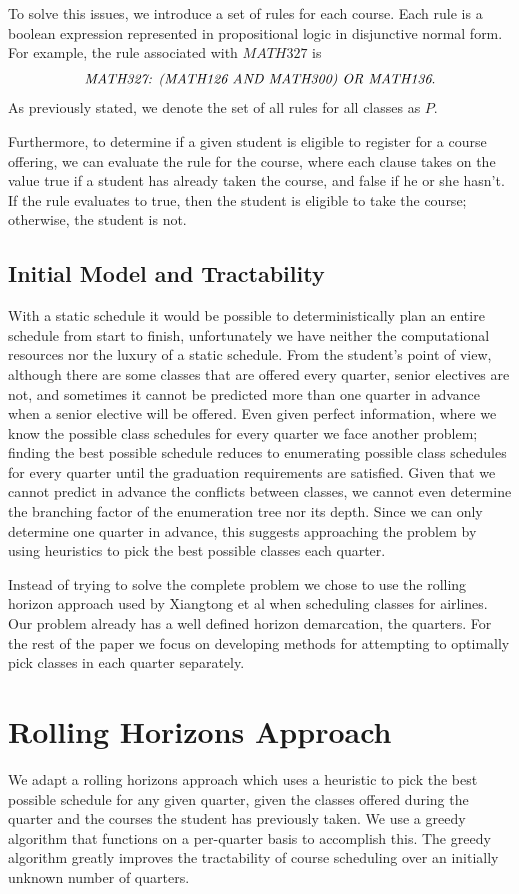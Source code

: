 \documentclass[11pt]{article} %
\begin{document}
To solve this issues, we introduce a set of rules for each course. Each rule is
a boolean expression represented in propositional logic in disjunctive normal
form. For example, the rule associated with $MATH327$ is $$ \text{{\it MATH327:
(MATH126 AND MATH300) OR MATH136}}.  $$ As previously stated, we denote the set
of all rules for all classes as $P$.

Furthermore, to determine if a given student is eligible to register for
a course offering, we can evaluate the rule for the course, where each clause
takes on the value true if a student has already taken the course, and false if
he or she hasn't. If the rule evaluates to true, then the student is eligible to
take the course; otherwise, the student is not.

\subsection{Initial Model and Tractability} With a static schedule it would be
possible to deterministically plan an entire schedule from start to finish,
unfortunately we have neither the computational resources nor the luxury of
a static schedule. From the student’s point of view, although there are some
classes that are offered every quarter, senior electives are not, and sometimes
it cannot be predicted more than one quarter in advance when a senior elective
will be offered. Even given perfect information, where we know the possible
class schedules for every quarter we face another problem; finding the best
possible schedule reduces to enumerating possible class schedules for every
quarter until the graduation requirements are satisfied. Given that we cannot
predict in advance the conflicts between classes, we cannot even determine the
branching factor of the enumeration tree nor its depth. Since we can only
determine one quarter in advance, this suggests approaching the problem by using
heuristics to pick the best possible classes each quarter.

Instead of trying to solve the complete problem we chose to use the rolling
horizon approach used by Xiangtong et al \cite{xiangton:informs} when scheduling
classes for airlines. Our problem already has a well defined horizon
demarcation, the quarters. For the rest of the paper we focus on developing
methods for attempting to optimally pick classes in each quarter separately.

\section{Rolling Horizons Approach} We adapt a rolling horizons approach which
uses a heuristic to pick the best possible schedule for any given quarter, given
the classes offered during the quarter and the courses the student has
previously taken. We use a greedy algorithm that functions on a per-quarter
basis to accomplish this. The greedy algorithm greatly improves the tractability
of course scheduling over an initially unknown number of quarters.
\end{document}
